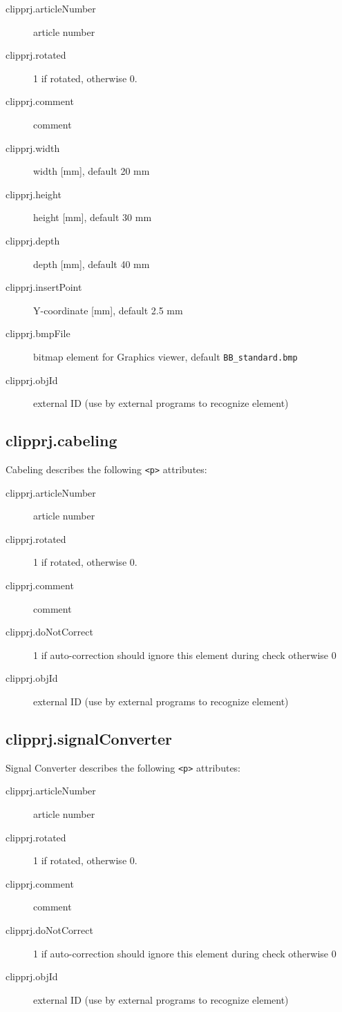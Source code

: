 \documentclass[%
	a4paper,
	oneside,
	listof=numbered,
	parskip=half,
	headsepline=true,
	footsepline=false,
	normalheadings,
	0.7headlines,
	headexclude,
	]{scrbook}
\begin{document}
\begin{description}
	\item[clipprj.articleNumber] article number 
	\item[clipprj.rotated] 1 if rotated, otherwise 0. 
	\item[clipprj.comment] comment 
	\item[clipprj.width] width [mm], default 20 mm 
	\item[clipprj.height] height [mm], default 30 mm 
	\item[clipprj.depth] depth [mm], default 40 mm 
	\item[clipprj.insertPoint] Y-coordinate [mm], default 2.5 mm 
	\item[clipprj.bmpFile] bitmap element for Graphics viewer, default \verb|BB_standard.bmp|
	\item[clipprj.objId] external ID (use by external programs to recognize element) 
\end{description}

\subsection{clipprj.cabeling}
 
Cabeling describes the following \verb|<p>| attributes: 

\begin{description}
	\item[clipprj.articleNumber] article number 
	\item[clipprj.rotated] 1 if rotated, otherwise 0. 
	\item[clipprj.comment] comment 
	\item[clipprj.doNotCorrect] 1 if auto-correction should ignore this element during check otherwise 0 
	\item[clipprj.objId] external ID (use by external programs to recognize element) 
\end{description}

\subsection{clipprj.signalConverter}
 
Signal Converter describes the following \verb|<p>| attributes: 

\begin{description}
	\item[clipprj.articleNumber] article number 
	\item[clipprj.rotated] 1 if rotated, otherwise 0. 
	\item[clipprj.comment] comment 
	\item[clipprj.doNotCorrect] 1 if auto-correction should ignore this element during check otherwise 0 
	\item[clipprj.objId] external ID (use by external programs to recognize element) 
\end{description}
\end{document}

